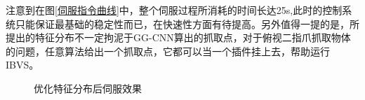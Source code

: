 \documentclass[fontset=fandol,type=bachelor,campus=harbin,bsmainpagenumberline=true]{hithesisbook}
\begin{document}
注意到在图\ref{伺服指令曲线}中，整个伺服过程所消耗的时间长达25s,此时的控制系统只能保证最基础的稳定性而已，在快速性方面有待提高。另外值得一提的是，所提出的特征分布不一定拘泥于GG-CNN算出的抓取点，对于俯视二指爪抓取物体的问题，任意算法给出一个抓取点，它都可以当一个插件挂上去，帮助运行IBVS。
\begin{figure}[h]
	\centering
	\caption{优化特征分布后伺服效果}
	\label{优化自定义效果}
\end{figure}
\end{document}
